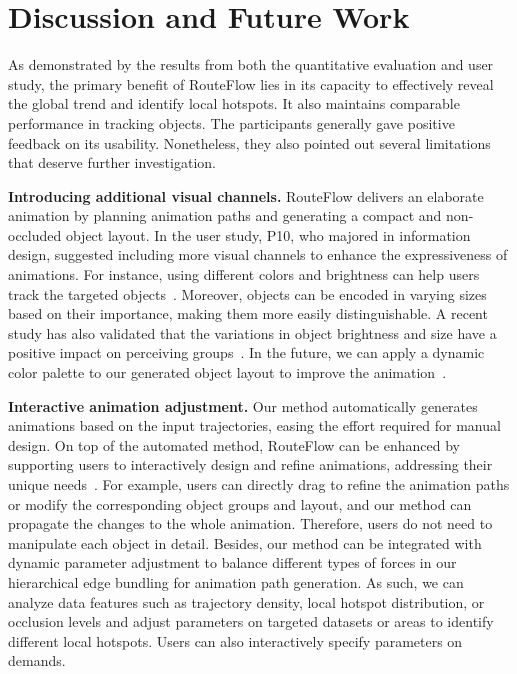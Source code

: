 \section{Discussion and Future Work}
\label{sec:discuss}
As demonstrated by the results from both the quantitative evaluation and user study, the primary benefit of RouteFlow lies in its capacity to effectively reveal the global trend and identify local hotspots.
It also maintains comparable performance in tracking objects.
The participants generally gave positive feedback on its usability.
Nonetheless, they also pointed out several limitations that deserve further investigation.

\noindent\textbf{Introducing additional visual channels.}
RouteFlow delivers an elaborate animation by planning animation paths and generating a compact and non-occluded object layout. 
In the user study, P10, who majored in information design, suggested including more visual channels to enhance the expressiveness of animations.
For instance, using different colors and brightness can help users track the targeted objects~\cite{hu2016spot}.
Moreover, objects can be encoded in varying sizes based on their importance, making them more easily distinguishable.
A recent study has also validated that the variations in object brightness and size have a positive impact on perceiving groups~\cite{chalbi2020common}.
In the future, we can apply a dynamic color palette to our generated object layout to improve the animation~\cite{chen2024dynamic}.


\noindent\textbf{Interactive animation adjustment.}
Our method automatically generates animations based on the input trajectories, easing the effort required for manual design. 
On top of the automated method, RouteFlow can be enhanced by supporting users to interactively design and refine animations, addressing their unique needs~\cite{wang2017vector}.
For example, users can directly drag to refine the animation paths or modify the corresponding object groups and layout, and our method can propagate the changes to the whole animation. 
Therefore, users do not need to manipulate each object in detail.
Besides, our method can be integrated with dynamic parameter adjustment to balance different types of forces in our hierarchical edge bundling for animation path generation. 
As such, we can analyze data features such as trajectory density, local hotspot distribution, or occlusion levels and adjust parameters on targeted datasets or areas to identify different local hotspots. 
Users can also interactively specify parameters on demands. 



